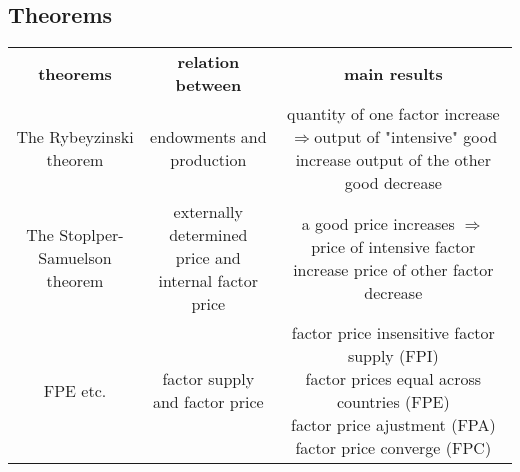 \documentclass{article}
\begin{document}
\subsection{Theorems}
\begin{center}
\begin{tabular}{ c c c }
 \textbf{theorems} & \textbf{relation between} & \textbf{main results}\\
 The Rybeyzinski theorem & endowments and production & \thead{quantity of one factor increase\\$\Rightarrow$output of "intensive" good increase\\output of the other good decrease} \\ 
 The Stoplper-Samuelson theorem & \thead{externally determined price and \\internal factor price} & \thead{a good price increases \\$\Rightarrow$ price of intensive factor increase\\price of other factor decrease} \\  
 FPE etc. & factor supply and factor price & \thead{factor price insensitive factor supply (FPI)\\factor prices equal across countries (FPE)\\factor price ajustment (FPA)\\factor price converge (FPC)}
\end{tabular}
\end{center}
\end{document}
